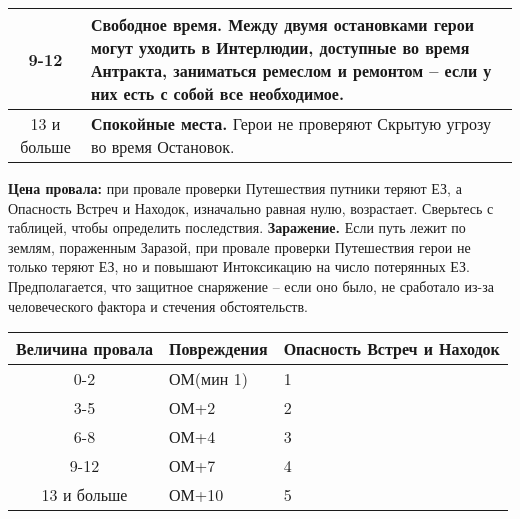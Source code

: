 \begin{enumerate}
\begin{center}
\begin{tabular}{|c|p{10cm}|}
      9-12 & \textbf{Свободное время.} Между двумя остановками герои могут уходить в Интерлюдии, доступные во время Антракта, заниматься ремеслом и ремонтом – если у них есть с собой все необходимое. \\ \hline
      13 и больше & \textbf{Спокойные места.} Герои не проверяют Скрытую угрозу во время Остановок. \\ \hline
    \end{tabular} \end{center}
    \textbf{Цена провала:} при провале проверки Путешествия путники теряют ЕЗ, а Опасность Встреч и Находок, изначально равная нулю, возрастает.  Сверьтесь с таблицей, чтобы определить последствия.
    \newline \textbf{Заражение.} Если путь лежит по землям, пораженным Заразой, при провале проверки Путешествия герои не только теряют ЕЗ, но и повышают Интоксикацию на число потерянных ЕЗ. Предполагается, что защитное снаряжение – если оно было, не сработало из-за человеческого фактора и стечения обстоятельств.

    \begin{center} \begin{tabular}{|c|p{5cm}|p{5cm}|} \hline
      \textbf{Величина провала} & \textbf{Повреждения} & \textbf{Опасность Встреч и Находок} \\ \hline
      0-2 & ОМ(мин 1) & 1 \\ \hline
      3-5 & ОМ+2 & 2 \\ \hline
      6-8 & ОМ+4 & 3 \\ \hline
      9-12 & ОМ+7 & 4 \\ \hline
      13 и больше & ОМ+10 & 5 \\ \hline
    \end{tabular} \end{center}


\end{enumerate}
